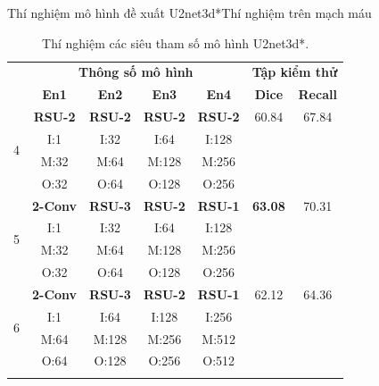 \documentclass[
	10pt,                %
	aspectratio=169,     %
]{beamer}
\begin{document}
	\begin{frame}{Thí nghiệm mô hình đề xuất U2net3d*}{Thí nghiệm trên mạch máu}
	\vspace{3mm}
	\begin{table}[H]
        \centering
        \begin{tabular}{c|c c c c|c c}
        \Xhline{3\arrayrulewidth}
            \multirow{2}{*}{\textbf{STT}} & \multicolumn{4}{c|}{\textbf{Thông số mô hình}} & \multicolumn{2}{c}{\textbf{Tập kiểm thử}} \\
            & \textbf{En1} & \textbf{En2} & \textbf{En3} & \textbf{En4} & \textbf{Dice} & \textbf{Recall} \\ 
            \hline
            \multirow{4}{*}{4} & \textbf{RSU-2} & \textbf{RSU-2} & \textbf{RSU-2} & \textbf{RSU-2} & 60.84 & 67.84 \\
                                          & I:1  & I:32 & I:64 & I:128  \\ 
                                          & M:32 & M:64 & M:128 & M:256 \\
                                          & O:32 & O:64 & O:128 & O:256 \\
            \hline
            \multirow{4}{*}{5} & \textbf{2-Conv} & \textbf{RSU-3} & \textbf{RSU-2} & \textbf{RSU-1} & \textbf{63.08} & 70.31 \\
                                          & I:1  & I:32 & I:64 & I:128  \\ 
                                          & M:32 & M:64 & M:128 & M:256 \\
                                          & O:32 & O:64 & O:128 & O:256 \\
            \hline
            \multirow{4}{*}{6} & \textbf{2-Conv} & \textbf{RSU-3} & \textbf{RSU-2} & \textbf{RSU-1} & 62.12 & 64.36\\
                                          & I:1  & I:64  & I:128 & I:256 \\ 
                                          & M:64 & M:128 & M:256 & M:512 \\
                                          & O:64 & O:128 & O:256 & O:512 \\
        \Xhline{3\arrayrulewidth}
        \end{tabular}
        \caption{Thí nghiệm các siêu tham số mô hình U2net3d*.}
    \end{table}
	\end{frame}
	
\end{document}
